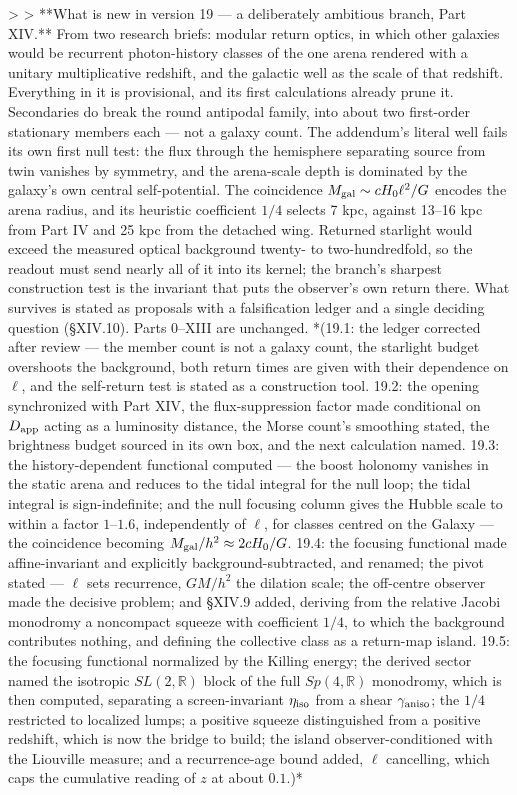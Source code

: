 >
> **What is new in version 19 — a deliberately ambitious branch, Part XIV.** From two research briefs: modular return optics, in which other galaxies would be recurrent photon-history classes of the one arena rendered with a unitary multiplicative redshift, and the galactic well as the scale of that redshift. Everything in it is provisional, and its first calculations already prune it. Secondaries do break the round antipodal family, into about two first-order stationary members each — not a galaxy count. The addendum's literal well fails its own first null test: the flux through the hemisphere separating source from twin vanishes by symmetry, and the arena-scale depth is dominated by the galaxy's own central self-potential. The coincidence $M_{\rm gal}\sim cH_0\ell^2/G$ encodes the arena radius, and its heuristic coefficient $1/4$ selects 7 kpc, against 13–16 kpc from Part IV and 25 kpc from the detached wing. Returned starlight would exceed the measured optical background twenty- to two-hundredfold, so the readout must send nearly all of it into its kernel; the branch's sharpest construction test is the invariant that puts the observer's own return there. What survives is stated as proposals with a falsification ledger and a single deciding question (§XIV.10). Parts 0–XIII are unchanged. *(19.1: the ledger corrected after review — the member count is not a galaxy count, the starlight budget overshoots the background, both return times are given with their dependence on $\ell$, and the self-return test is stated as a construction tool. 19.2: the opening synchronized with Part XIV, the flux-suppression factor made conditional on $D_{\rm app}$ acting as a luminosity distance, the Morse count's smoothing stated, the brightness budget sourced in its own box, and the next calculation named. 19.3: the history-dependent functional computed — the boost holonomy vanishes in the static arena and reduces to the tidal integral for the null loop; the tidal integral is sign-indefinite; and the null focusing column gives the Hubble scale to within a factor $1$–$1.6$, independently of $\ell$, for classes centred on the Galaxy — the coincidence becoming $M_{\rm gal}/h^2\approx2cH_0/G$. 19.4: the focusing functional made affine-invariant and explicitly background-subtracted, and renamed; the pivot stated — $\ell$ sets recurrence, $GM/h^2$ the dilation scale; the off-centre observer made the decisive problem; and §XIV.9 added, deriving from the relative Jacobi monodromy a noncompact squeeze with coefficient $1/4$, to which the background contributes nothing, and defining the collective class as a return-map island. 19.5: the focusing functional normalized by the Killing energy; the derived sector named the isotropic $SL(2,\mathbb R)$ block of the full $Sp(4,\mathbb R)$ monodromy, which is then computed, separating a screen-invariant $\eta_{\rm iso}$ from a shear $\gamma_{\rm aniso}$; the $1/4$ restricted to localized lumps; a positive squeeze distinguished from a positive redshift, which is now the bridge to build; the island observer-conditioned with the Liouville measure; and a recurrence-age bound added, $\ell$ cancelling, which caps the cumulative reading of $z$ at about $0.1$.)*

